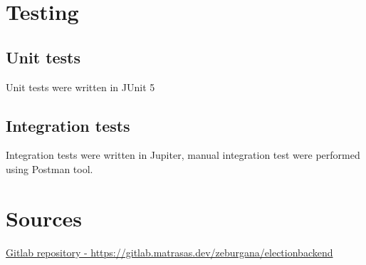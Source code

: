 \documentclass[12pt,a4paper]{article}
\begin{document}
\section{Testing}
\subsection{Unit tests}
Unit tests were written in JUnit 5

\subsection{Integration tests}
Integration tests were written in Jupiter, manual integration test were performed using Postman tool.

\section{Sources}
\hyperlink{https://gitlab.matrasas.dev/zeburgana/electionbackend}{Gitlab repository - https://gitlab.matrasas.dev/zeburgana/electionbackend}
\end{document}
